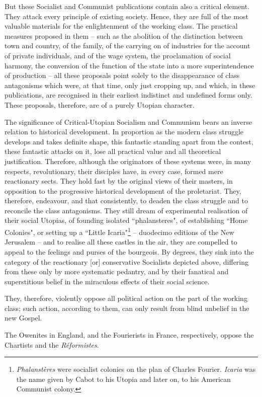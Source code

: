 But these Socialist and Communist publications contain also a critical element. They attack every principle of existing society. Hence, they are full of the most valuable materials for the enlightenment of the working class. The practical measures proposed in them – such as the abolition of the distinction between town and country, of the family, of the carrying on of industries for the account of private individuals, and of the wage system, the proclamation of social harmony, the conversion of the function of the state into a more superintendence of production – all these proposals point solely to the disappearance of class antagonisms which were, at that time, only just cropping up, and which, in these publications, are recognised in their earliest indistinct and undefined forms only. These proposals, therefore, are of a purely Utopian character. 

The significance of Critical-Utopian Socialism and Communism bears an inverse relation to historical development. In proportion as the modern class struggle develops and takes definite shape, this fantastic standing apart from the contest, these fantastic attacks on it, lose all practical value and all theoretical justification. Therefore, although the originators of these systems were, in many respects, revolutionary, their disciples have, in every case, formed mere reactionary sects. They hold fast by the original views of their masters, in opposition to the progressive historical development of the proletariat. They, therefore, endeavour, and that consistently, to deaden the class struggle and to reconcile the class antagonisms. They still dream of experimental realisation of their social Utopias, of founding isolated ``phalansteres", of establishing ``Home Colonies", or setting up a ``Little Icaria"\footnote{\emph{Phalanstères} were socialist colonies on the plan of Charles Fourier. \emph{Icaria} was the name given by Cabot to his Utopia and later on, to his American Communist colony.} – duodecimo editions of the New Jerusalem – and to realise all these castles in the air, they are compelled to appeal to the feelings and purses of the bourgeois. By degrees, they sink into the category of the reactionary [or] conservative Socialists depicted above, differing from these only by more systematic pedantry, and by their fanatical and superstitious belief in the miraculous effects of their social science. 

They, therefore, violently oppose all political action on the part of the working class; such action, according to them, can only result from blind unbelief in the new Gospel. 

The Owenites in England, and the Fourierists in France, respectively, oppose the Chartists and the \emph{Réformistes}. 

